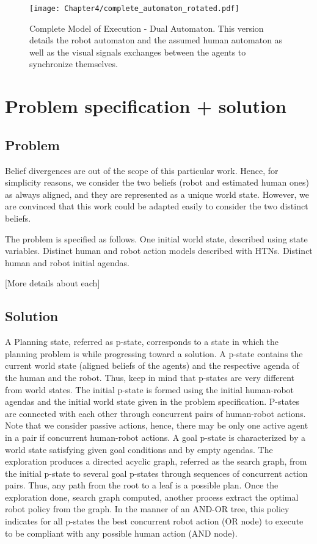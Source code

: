 \begin{figure}
    \centering
    \texttt{[image: Chapter4/complete\_automaton\_rotated.pdf]}
    \caption{Complete Model of Execution - Dual Automaton. This version details the robot automaton and the assumed human automaton as well as the visual signals exchanges between the agents to synchronize themselves.}
\end{figure}

\section{Problem specification + solution}

    \subsection{Problem}

Belief divergences are out of the scope of this particular work. Hence, for simplicity reasons, we consider the two beliefs (robot and estimated human ones) as always aligned, and they are represented as a unique world state. However, we are convinced that this work could be adapted easily to consider the two distinct beliefs.

The problem is specified as follows. One initial world state, described using state variables. Distinct human and robot action models described with HTNs. Distinct human and robot initial agendas. 

[More details about each]

    \subsection{Solution}

A Planning state, referred as p-state, corresponds to a state in which the planning problem is while progressing toward a solution. A p-state contains the current world state (aligned beliefs of the agents) and the respective agenda of the human and the robot. Thus, keep in mind that p-states are very different from world states.
The initial p-state is formed using the initial human-robot agendas and the initial world state given in the problem specification. P-states are connected with each other through concurrent pairs of human-robot actions. Note that we consider passive actions, hence, there may be only one active agent in a pair if concurrent human-robot actions. A goal p-state is characterized by a world state satisfying given goal conditions and by empty agendas.
The exploration produces a directed acyclic graph, referred as the search graph, from the initial p-state to several goal p-states through sequences of concurrent action pairs. Thus, any path from the root to a leaf is a possible plan. Once the exploration done, search graph computed, another process extract the optimal robot policy from the graph. In the manner of an AND-OR tree, this policy indicates for all p-states the best concurrent robot action (OR node) to execute to be compliant with any possible human action (AND node).

